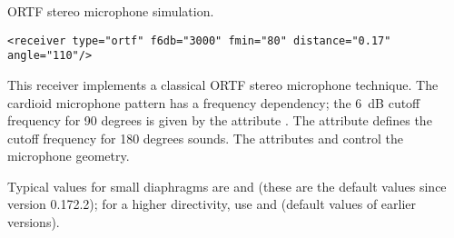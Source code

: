 ORTF stereo microphone simulation.
 
\begin{lstlisting}[numbers=none]
<receiver type="ortf" f6db="3000" fmin="80" distance="0.17" angle="110"/>
\end{lstlisting}

This receiver implements a classical ORTF stereo microphone
technique. The cardioid microphone pattern has a frequency dependency;
the 6~dB cutoff frequency for 90 degrees is given by the attribute
. The attribute  defines the cutoff
frequency for 180 degrees sounds. The attributes  and
 control the microphone geometry.

Typical values for small diaphragms are  and
 (these are the default values since version
0.172.2); for a higher directivity, use  and
 (default values of earlier versions).


